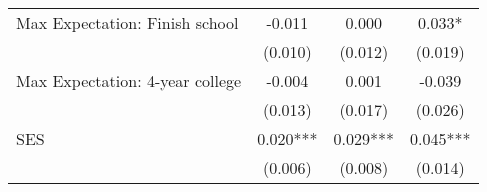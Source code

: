 {\begin{tabular}{lccc}
\hspace{3mm}Max Expectation: Finish school&      -0.011   &       0.000   &       0.033*  \\
                    &     (0.010)   &     (0.012)   &     (0.019)   \\
 
\hspace{3mm}Max Expectation: 4-year college&      -0.004   &       0.001   &      -0.039   \\
                    &     (0.013)   &     (0.017)   &     (0.026)   \\
 
\hspace{3mm}SES     &       0.020***&       0.029***&       0.045***\\
                    &     (0.006)   &     (0.008)   &     (0.014)   \\
 

\bottomrule
\end{tabular}
}
